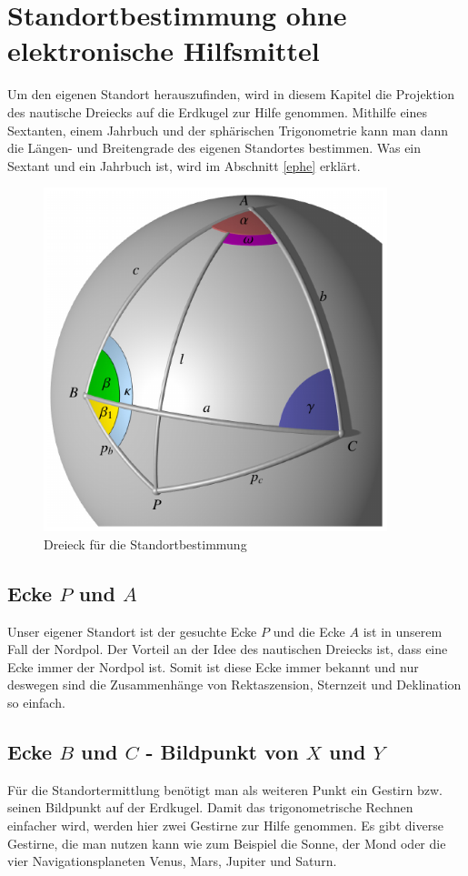 \section{Standortbestimmung ohne elektronische Hilfsmittel}
\label{sta}
Um den eigenen Standort herauszufinden, wird in diesem Kapitel die Projektion des nautische Dreiecks auf die Erdkugel zur Hilfe genommen. 
Mithilfe eines Sextanten, einem Jahrbuch und der sphärischen Trigonometrie kann man dann die Längen- und Breitengrade des eigenen Standortes bestimmen.
Was ein Sextant und ein Jahrbuch ist, wird im Abschnitt \ref{ephe} erklärt.
\begin{figure}
	\begin{center}
		\includegraphics[width=10cm]{papers/nav/bilder/dreieck.pdf}
		\caption[Dreieck für die Standortbestimmung]{Dreieck für die Standortbestimmung}
		\label{d1}
	\end{center}
\end{figure}




\subsection{Ecke $P$ und $A$}
Unser eigener Standort ist der gesuchte Ecke $P$ und die Ecke $A$ ist in unserem Fall der Nordpol.
Der Vorteil an der Idee des nautischen Dreiecks ist, dass eine Ecke immer der Nordpol ist. 
Somit ist diese Ecke immer bekannt und nur deswegen sind die Zusammenhänge von Rektaszension, Sternzeit und Deklination so einfach.

\subsection{Ecke $B$ und $C$ - Bildpunkt von $X$ und $Y$}
Für die Standortermittlung benötigt man als weiteren Punkt ein Gestirn bzw. seinen Bildpunkt auf der Erdkugel. 
Damit das trigonometrische Rechnen einfacher wird, werden hier zwei Gestirne zur Hilfe genommen.
Es gibt diverse Gestirne, die man nutzen kann wie zum Beispiel die Sonne, der Mond oder die vier Navigationsplaneten Venus, Mars, Jupiter und Saturn.

